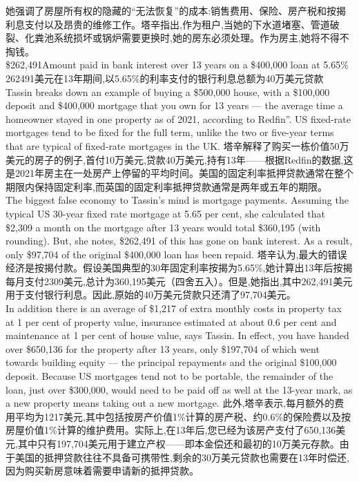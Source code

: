 \documentclass[a4paper,12pt]{article}
\begin{document}
她强调了房屋所有权的隐藏的“无法恢复”的成本:销售费用、保险、房产税和按揭利息支付以及昂贵的维修工作。塔辛指出,作为租户,当她的下水道堵塞、管道破裂、化粪池系统损坏或锅炉需要更换时,她的房东必须处理。作为房主,她将不得不掏钱。
\\\$262,491Amount paid in bank interest over 13 years on a \$400,000 loan at 5.65\%
262491美元在13年期间,以5.65\%的利率支付的银行利息总额为40万美元贷款
\\Tassin breaks down an example of buying a \$500,000 house, with a \$100,000 deposit and \$400,000 mortgage that you own for 13 years — the average time a homeowner stayed in one property as of 2021, according to Redfin”. US fixed-rate mortgages tend to be fixed for the full term, unlike the two or five-year terms that are typical of fixed-rate mortgages in the UK.
塔辛解释了购买一栋价值50万美元的房子的例子,首付10万美元,贷款40万美元,持有13年——根据Redfin的数据,这是2021年房主在一处房产上停留的平均时间。美国的固定利率抵押贷款通常在整个期限内保持固定利率,而英国的固定利率抵押贷款通常是两年或五年的期限。
\\The biggest false economy to Tassin's mind is mortgage payments. Assuming the typical US 30-year fixed rate mortgage at 5.65 per cent, she calculated that \$2,309 a month on the mortgage after 13 years would total \$360,195 (with rounding). But, she notes, \$262,491 of this has gone on bank interest. As a result, only \$97,704 of the original \$400,000 loan has been repaid.
塔辛认为,最大的错误经济是按揭付款。假设美国典型的30年固定利率按揭为5.65\%,她计算出13年后按揭每月支付2309美元,总计为360,195美元（四舍五入）。但是,她指出,其中262,491美元用于支付银行利息。因此,原始的40万美元贷款只还清了97,704美元。
\\In addition there is an average of \$1,217 of extra monthly costs in property tax at 1 per cent of property value, insurance estimated at about 0.6 per cent and maintenance at 1 per cent of house value, says Tassin. In effect, you have handed over \$650,136 for the property after 13 years, only \$197,704 of which went towards building equity — the principal repayments and the original \$100,000 deposit. Because US mortgages tend not to be portable, the remainder of the loan, just over \$300,000, would need to be paid off as well at the 13-year mark, as a new property means taking out a new mortgage.
此外,塔辛表示,每月额外的费用平均为1217美元,其中包括按房产价值1\%计算的房产税、约0.6\%的保险费以及按房屋价值1\%计算的维护费用。实际上,在13年后,您已经为该房产支付了650,136美元,其中只有197,704美元用于建立产权——即本金偿还和最初的10万美元存款。由于美国的抵押贷款往往不具备可携带性,剩余的30万美元贷款也需要在13年时偿还,因为购买新房意味着需要申请新的抵押贷款。
\end{document}
